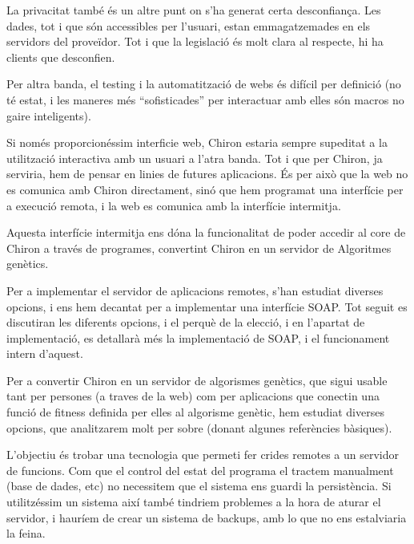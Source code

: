 \documentclass[titlepage,a4paper,12pt]{book}
\begin{document}
	   La privacitat també és un altre punt on s'ha generat certa desconfiança.  Les
	   dades, tot i que són accessibles per l'usuari, estan emmagatzemades en els
	   servidors del proveïdor.  Tot i que la legislació és molt clara al respecte,
	   hi ha clients que desconfien.

	   Per altra banda, el testing i la automatització de webs és difícil per
	   definició (no té estat, i les maneres més ``sofisticades'' per interactuar amb
			   elles són macros no gaire inteligents).

	   Si només proporcionéssim interficie web, Chiron estaria sempre supeditat a la
	   utilització interactiva amb un usuari a l'atra banda.  Tot i que per Chiron, ja
	   serviria, hem de pensar en linies de futures aplicacions.  És per això que la
	   web no es comunica amb Chiron directament, sinó que hem programat una interfície
	   per a execució remota, i la web es comunica amb la interfície intermitja.

	   Aquesta interfície intermitja ens dóna la funcionalitat de poder accedir al core 
	   de Chiron a través de programes, convertint Chiron en un servidor de Algoritmes
	   genètics.

	   Per a implementar el servidor de aplicacions remotes, s'han estudiat diverses
	   opcions, i ens hem decantat per a implementar una interfície SOAP.  Tot seguit
	   es discutiran les diferents opcions, i el perquè de la elecció, i en l'apartat
	   de implementació, es detallarà més la implementació de SOAP, i el funcionament
	   intern d'aquest.


	   Per a convertir Chiron en un servidor de algorismes genètics, que sigui usable
	   tant per persones (a traves de la web) com per aplicacions que conectin una
	   funció de fitness definida per elles al algorisme genètic, hem estudiat diverses
	   opcions, que analitzarem molt per sobre (donant algunes referències bàsiques).

	   L'objectiu és trobar una tecnologia que permeti fer crides remotes a un servidor
	   de funcions.  Com que el control del estat del programa el tractem manualment
	   (base de dades, etc) no necessitem que el sistema ens guardi la persistència.
	   Si utilitzéssim un sistema així també tindriem problemes a la hora de aturar el
	   servidor, i hauríem de crear un sistema de backups, amb lo que no ens
	   estalviaria la feina.
\end{document}
